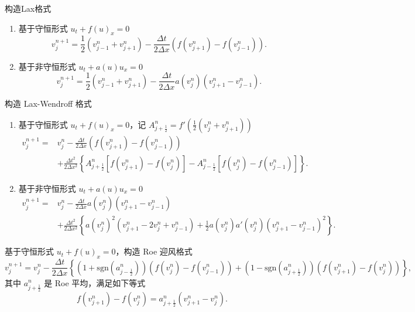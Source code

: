 \begin{example}
    构造Lax格式
    \begin{enumerate}
        \item 基于守恒形式 $u_t + f(u)_x = 0$
              \[
                  v_j^{n+1} = \frac12 (v_{j-1}^n + v_{j+1}^n)
                  - \frac{\Delta t}{2\Delta x} \left(f(v_{j+1}^n)-f(v_{j-1}^n)\right).
              \]
        \item 基于非守恒形式 $u_t + a(u) u_x = 0$
              \[
                  v_j^{n+1} = \frac12 (v_{j-1}^n + v_{j+1}^n)
                  - \frac{\Delta t}{2\Delta x} a(v_j^n)\left(v_{j+1}^n-v_{j-1}^n\right).
              \]
    \end{enumerate}
\end{example}

\begin{example}
    构造 Lax-Wendroff 格式
    \begin{enumerate}
        \item 基于守恒形式 $u_t + f(u)_x = 0$，记 $A_{j+\frac12}^n = f'(\frac12(v_j^n+v_{j+1}^n))$
              \begin{align*}
                  v_j^{n+1} ={} & v_j^n
                  - \frac{\Delta t}{2\Delta x} \left(f(v_{j+1}^n)-f(v_{j-1}^n)\right)
                  \\ & + \frac{\Delta t^2}{2\Delta x^2}\left\{
                  A_{j+\frac12}^n [f(v_{j+1}^n) - f(v_{j}^n)]
                  - A_{j-\frac12}^n [f(v_{j}^n) - f(v_{j-1}^n)]
                  \right\}.
              \end{align*}
        \item 基于非守恒形式 $u_t + a(u) u_x = 0$
              \begin{align*}
                  v_j^{n+1} ={} & v_j^n
                  - \frac{\Delta t}{2\Delta x} a(v_j^n)\left(v_{j+1}^n-v_{j-1}^n\right)
                  \\ & + \frac{\Delta t^2}{2\Delta x^2}\left\{
                  a(v_j^n)^2(v_{j+1}^n - 2 v_j^n + v_{j-1}^n)
                  + \frac12 a(v_j^n)a'(v_j^n)(v_{j+1}^n-v_{j-1}^n)^2
                  \right\}.
              \end{align*}
    \end{enumerate}
\end{example}


\begin{example}
    基于守恒形式 $u_t + f(u)_x = 0$，构造 Roe 迎风格式
    \[
        v_j^{n+1} = v_j^n - \frac{\Delta t}{2\Delta x}
        \left\{
        (1+\text{sgn}(a_{j-\frac12}^n))(f(v_{j}^n)-f(v_{j-1}^n))
        + (1-\text{sgn}(a_{j+\frac12}^n))(f(v_{j+1}^n)-f(v_{j}^n))
        \right\},
    \]
    其中 $a_{j+\frac12}^n$ 是 Roe 平均，满足如下等式
    \[
        f(v_{j+1}^n)-f(v_{j}^n) = a_{j+\frac12}^n(v_{j+1}^n-v_j^n).
    \]
\end{example}


